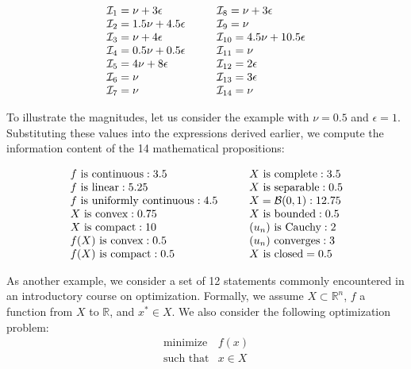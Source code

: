 \documentclass[11pt]{article}
\theoremstyle{definition}
\theoremstyle{plain}
\theoremstyle{remark}
\begin{document}
{\small
\[
\begin{array}{l@{\hspace{1cm}}l}
\mathcal{I}_1 = \nu + 3\epsilon & \mathcal{I}_8 = \nu + 3\epsilon \\
\mathcal{I}_2 = 1.5\nu + 4.5\epsilon & \mathcal{I}_9 = \nu \\
\mathcal{I}_3 = \nu + 4\epsilon & \mathcal{I}_{10} = 4.5\nu + 10.5\epsilon \\
\mathcal{I}_4 = 0.5\nu + 0.5\epsilon & \mathcal{I}_{11} = \nu \\
\mathcal{I}_5 = 4\nu + 8\epsilon & \mathcal{I}_{12} = 2\epsilon \\
\mathcal{I}_6 = \nu & \mathcal{I}_{13} = 3\epsilon \\
\mathcal{I}_7 = \nu & \mathcal{I}_{14} = \nu \\
\end{array}
\]
}

To illustrate the magnitudes, let us consider the example with \( \nu = 0.5 \) and \( \epsilon = 1 \). Substituting these values into the expressions derived earlier, we compute the information content of the 14 mathematical propositions:


{\small
\[
\begin{array}{l@{\hspace{1cm}}l}
f \text{ is continuous}: 3.5 & X \text{ is complete}: 3.5 \\
f \text{ is linear} : 5.25 & X \text{ is separable} : 0.5 \\
f \text{ is uniformly continuous} : 4.5 & X=\mathcal{B}(0,1) : 12.75 \\
X \text{ is convex} : 0.75 & X \text{ is bounded} :0.5 \\
X \text{ is compact} : 10 & (u_n) \text{ is Cauchy} : 2 \\
f(X) \text{ is convex} : 0.5 & (u_n) \text{ converges}:3\\
f(X) \text{ is compact} : 0.5 & X \text{ is closed} = 0.5 \\
\end{array}
\]
}


As another example, we consider a set of 12 statements commonly encountered in an introductory course on optimization. Formally, we assume $X\subset \mathbb{R}^n$, $f$ a function from $X$ to $\mathbb{R}$, and $x^*\in X$. We also consider the following optimization problem:
\[
\begin{array}{ll}
\text{minimize} & f(x) \\
\text{such that} & x \in X
\end{array}
\tag{P}
\]
\end{document}
